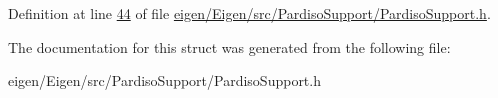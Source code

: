 Definition at line \hyperlink{eigen_2_eigen_2src_2_pardiso_support_2_pardiso_support_8h_source_l00044}{44} of file \hyperlink{eigen_2_eigen_2src_2_pardiso_support_2_pardiso_support_8h_source}{eigen/\+Eigen/src/\+Pardiso\+Support/\+Pardiso\+Support.\+h}.



The documentation for this struct was generated from the following file\+:\begin{DoxyCompactItemize}
\item 
eigen/\+Eigen/src/\+Pardiso\+Support/\+Pardiso\+Support.\+h\end{DoxyCompactItemize}
